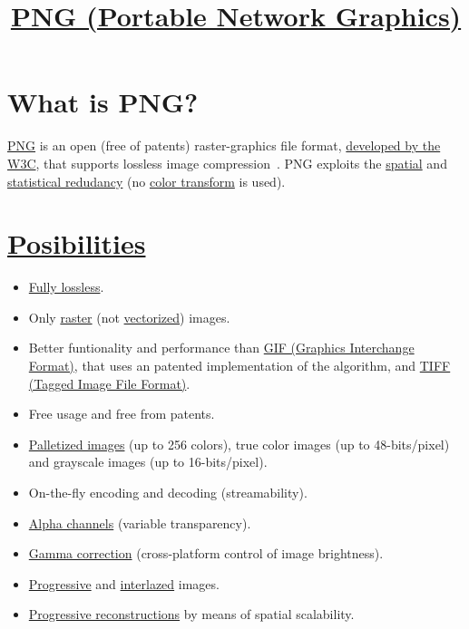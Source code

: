 \title{\href{http://www.libpng.org/pub/png}{PNG (Portable
  Network Graphics)}}

\maketitle
\tableofcontents

\section{What is PNG?}
\href{https://www.youtube.com/watch?v=EFUYNoFRHQI}{PNG} is an open
(free of patents) raster-graphics file format,
\href{https://en.wikipedia.org/wiki/Portable_Network_Graphics}{developed
  by the W3C}, that supports lossless image
compression~\cite{roelofs1999png}. PNG exploits the
\href{https://en.wikipedia.org/wiki/Image_compression}{spatial} and
\href{https://en.wikipedia.org/wiki/Data_compression}{statistical
  redudancy} (no \href{https://en.wikipedia.org/wiki/YUV}{color
  transform} is used).

\section{\href{http://www.libpng.org/pub/png/book/}{Posibilities}}
\begin{itemize}
\item \href{https://en.wikipedia.org/wiki/Lossless_compression}{Fully
  lossless}.
\item Only
  \href{https://en.wikipedia.org/wiki/Raster_graphics}{raster} (not
  \href{https://en.wikipedia.org/wiki/Vector_graphics}{vectorized})
  images.
\item Better funtionality and performance than
  \href{https://en.wikipedia.org/wiki/GIF}{GIF (Graphics Interchange
    Format)}, that uses an patented implementation of the
   algorithm, and
  \href{https://en.wikipedia.org/wiki/TIFF}{TIFF (Tagged Image File
    Format)}.
\item Free usage and free from patents.
\item
  \href{https://en.wikipedia.org/wiki/Palette_(computing)}{Palletized
    images} (up to 256 colors), true color images (up to
  48-bits/pixel) and grayscale images (up to 16-bits/pixel).
\item On-the-fly encoding and decoding (streamability).
\item \href{https://en.wikipedia.org/wiki/Alpha_compositing}{Alpha
  channels} (variable transparency).
\item \href{https://en.wikipedia.org/wiki/Gamma_correction}{Gamma
  correction} (cross-platform control of image brightness).
\item
  \href{https://en.wikipedia.org/wiki/Progressive_scan}{Progressive}
  and
  \href{https://en.wikipedia.org/wiki/Interlacing_(bitmaps)}{interlazed}
  images.
\item
  \href{http://www.libpng.org/pub/png/book/chapter08.html#png.ch08.div.6}{Progressive
    reconstructions} by means of spatial scalability.
\end{itemize} 

